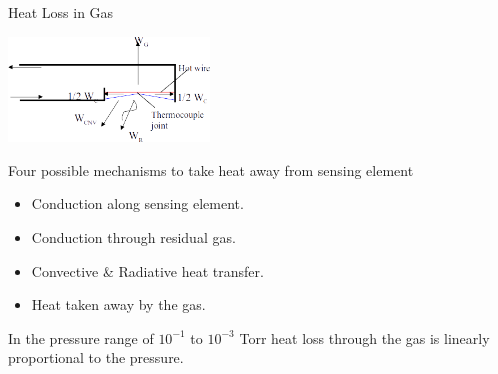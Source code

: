 \documentclass[11pt]{beamer}
\begin{document}
\begin{frame}{Heat Loss in Gas}

	\begin{exampleblock}{}
         		\begin{center}
						\includegraphics[width=0.4\textwidth]{HeatLoss.png}
				\end{center}
       \end{exampleblock}
       
       
 
         		\begin{exampleblock}{ }
         			  Four possible mechanisms to take heat away from sensing element
         			  \begin{itemize}
         			   \item Conduction along sensing element.
         			   \item Conduction through residual gas.
         			   \item Convective \& Radiative heat transfer.
         			   \item Heat taken away by the gas.
         			  \end{itemize}
 						
 				In the pressure range of $10^{-1}$ to $10^{-3} $ Torr heat loss through the gas  is linearly proportional to the pressure. 
       			\end{exampleblock}
            


\end{frame}
\end{document}
